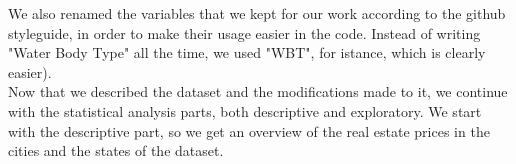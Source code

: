 We also renamed the variables that we kept for our work according to the github styleguide, in order to make their usage easier in the code. Instead of writing "Water Body Type" all the time, we used "WBT", for istance, which is clearly easier).\\


Now that we described the dataset and the modifications made to it, we continue with the statistical analysis parts, both descriptive and exploratory. We start with the descriptive part, so we get an overview of the real estate prices in the cities and the states of the dataset.\\



